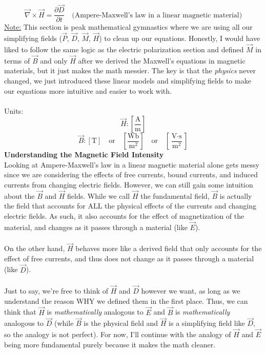 \documentclass[12pt]{article}
\begin{document}
\[\boxed{\vec{\nabla}\times\vec{H} = \frac{\partial \vec{D}}{\partial t} \quad \text{(Ampere-Maxwell's law in a linear magnetic material)}}\]
\underline{Note:} This section is peak mathematical gymnastics where we are using all our simplifying fields ($\vec{P}$, $\vec{D}$, $\vec{M}$, $\vec{H}$) to clean up our equations. Honestly, I would have liked to follow the same logic as the electric polarization section and defined $\vec{M}$ in terms of $\vec{B}$ and only $\vec{H}$ after we derived the Maxwell's equations in magnetic materials, but it just makes the math messier. The key is that the \textit{physics} never changed, we just introduced these linear models and simplifying fields to make our equations more intuitive and easier to work with.\\\\
Units:
\[\vec{H}: \left[\frac{\text{A}}{\text{m}}\right]\]
\[\vec{B}: \left[\text{T}\right]\quad\text{or}\quad\left[\frac{\text{Wb}}{\text{m}^2}\right]\quad\text{or}\quad\left[\frac{\text{V}\cdot\text{s}}{\text{m}^2}\right]\]
\textbf{Understanding the Magnetic Field Intensity}\\
Looking at Ampere-Maxwell's law in a linear magnetic material alone gets messy since we are considering the effects of free currents, bound currents, and induced currents from changing electric fields. However, we can still gain some intuition about the $\vec{B}$ and $\vec{H}$ fields. While we call $\vec{H}$ the fundamental field, $\vec{B}$ is actually the field that accounts for ALL the physical effects of the currents and changing electric fields. As such, it also accounts for the effect of magnetization of the material, and changes as it passes through a material (like $\vec{E}$).\\\\
On the other hand, $\vec{H}$ behaves more like a derived field that only accounts for the effect of free currents, and thus does not change as it passes through a material (like $\vec{D}$).\\\\
Just to say, we're free to think of $\vec{H}$ and $\vec{D}$ however we want, as long as we understand the reason WHY we defined them in the first place. Thus, we can think that $\vec{H}$ is \textit{mathematically} analogous to $\vec{E}$ and $\vec{B}$ is \textit{mathematically} analogous to $\vec{D}$ (while $\vec{B}$ is the physical field and $\vec{H}$ is a simplifying field like $\vec{D}$, so the analogy is not perfect). For now, I'll continue with the analogy of $\vec{H}$ and $\vec{E}$ being more fundamental purely because it makes the math cleaner.
\newpage
\end{document}
